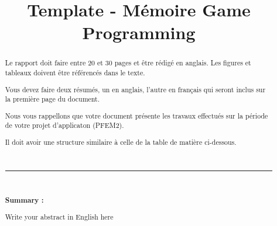 \documentclass{rapportCS}
\title{Template - Mémoire Game Programming} %
\begin{document}










        
\fairemarges %
\fairepagedegarde %

\begin{center}
	\begin{abstract}
 
Le rapport doit faire entre 20 et 30 pages et être rédigé en anglais. Les figures et tableaux doivent être référencés dans le texte. 

Vous devez faire deux résumés, un en anglais, l'autre en français qui seront inclus sur la première page du document.

Nous vous rappellons que votre document présente les travaux effectués sur la période de votre projet d'applicaton (PFEM2).

Il doit avoir une structure similaire à celle de la table de matière ci-dessous. 

       \\
        \rule{\linewidth}{0.2 mm} \\[0.4 cm]
        \begin{center}\textbf{Summary :}\end{center} 
        
        Write your abstract in English here

        
    \end{abstract}
\end{center}
\newpage
\end{document}
